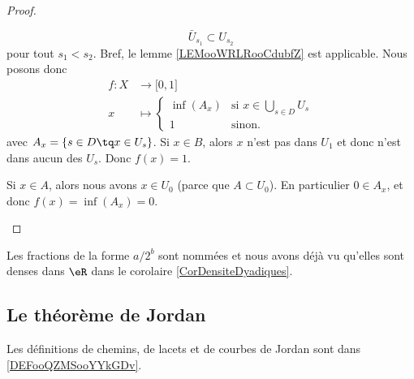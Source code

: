 \begin{proof}
\begin{subproof}
    \begin{equation}
        \bar U_{s_1}\subset U_{s_2}
    \end{equation}
    pour tout \( s_1<s_2\). Bref, le lemme \ref{LEMooWRLRooCdubfZ} est applicable. Nous posons donc 
    \begin{equation}
        \begin{aligned}
            f\colon X&\to \mathopen[ 0 , 1 \mathclose] \\
            x&\mapsto \begin{cases}
                \inf(A_x)    &   \text{si } x\in \bigcup_{s\in D}U_s\\
                1&    \text{sinon. }
            \end{cases}
        \end{aligned}
    \end{equation}
    avec \( A_x=\{ s\in D\tq x\in U_s \}\).
    Si \( x\in B\), alors \( x\) n'est pas dans \( U_1\) et donc n'est dans aucun des \( U_s\). Donc \( f(x)=1\).

    Si \( x\in A\), alors nous avons \( x\in U_0\) (parce que \( A\subset U_0\)). En particulier \( 0\in A_x\), et donc \( f(x)= \inf(A_x)=0\).
    \end{subproof}
\end{proof}

\begin{normaltext}
    Les fractions de la forme \( a/2^b\) sont nommées  et nous avons déjà vu qu'elles sont denses dans \( \eR\) dans le corolaire \ref{CorDensiteDyadiques}.
\end{normaltext}

\subsection{Le théorème de Jordan}

Les définitions de chemins, de lacets et de courbes de Jordan sont dans \ref{DEFooQZMSooYYkGDv}.

